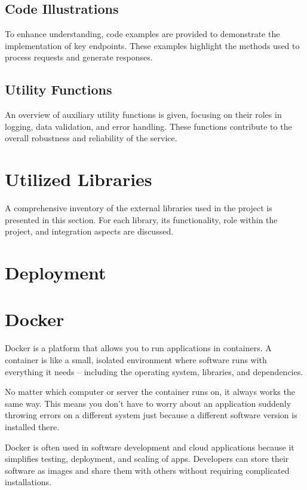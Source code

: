 \subsection{Code Illustrations}
To enhance understanding, code examples are provided to demonstrate the implementation of key endpoints. These examples highlight the methods used to process requests and generate responses.
\subsection{Utility Functions}
An overview of auxiliary utility functions is given, focusing on their roles in logging, data validation, and error handling. These functions contribute to the overall robustness and reliability of the service.

\section{Utilized Libraries}
A comprehensive inventory of the external libraries used in the project is presented in this section. For each library, its functionality, role within the project, and integration aspects are discussed.


\section{Deployment}


\section{Docker}
Docker is a platform that allows you to run applications in containers. A container is like a small, isolated environment where software runs with everything it needs – including the operating system, libraries, and dependencies.

No matter which computer or server the container runs on, it always works the same way. This means you don’t have to worry about an application suddenly throwing errors on a different system just because a different software version is installed there.

Docker is often used in software development and cloud applications because it simplifies testing, deployment, and scaling of apps. Developers can store their software as images and share them with others without requiring complicated installations.

